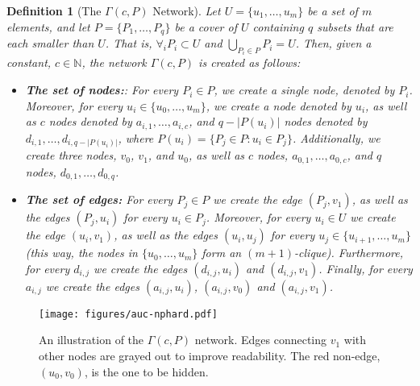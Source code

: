\documentclass[twocolumn]{article}
\newtheorem{definition}{Definition}
\newcommand{\N}{\mathbb{N}}
\begin{document}
\begin{definition}[The $\Gamma(c,P)$ Network]\label{def:GammNetwork} Let $U=\{u_1,\ldots, u_m\}$ be a set of $m$ elements, and let $P = \{P_1, \ldots, P_q\}$ be a cover of $U$ containing $q$ subsets that are each smaller than $U$. That is, $\forall_i P_i \subset U$ and $\bigcup_{P_i \in P}P_i=U$. Then, given a constant, $c \in \N$, the network $\Gamma(c,P)$ is created as follows:
%
\begin{itemize}[leftmargin=*]
\item \textbf{The set of nodes:}: For every $P_i \in P$, we create a single node, denoted by $P_i$. Moreover, for every $u_i \in \{u_0,\ldots, u_m\}$, we create a node denoted by $u_i$, as well as $c$ nodes denoted by $a_{i,1},\ldots,a_{i,c}$, and $q-|P(u_i)|$ nodes denoted by $d_{i,1},\ldots,d_{i,q-|P(u_i)|}$, where $P(u_i)=\{P_j \in P : u_i \in P_j\}$.
Additionally, we create three nodes, $v_0$, $v_1$, and $u_0$, as well as $c$ nodes, $a_{0,1},\ldots,a_{0,c}$, and $q$ nodes, $d_{0,1},\ldots,d_{0,q}$.
%
\item \textbf{The set of edges:} For every $P_j\in P$ we create the edge $(P_j,v_1)$, as well as the edges $(P_j,u_i)$ for every $u_i \in P_j$. Moreover, for every $u_i\in U$ we create the edge $(u_i,v_1)$, as well as the edges $(u_i,u_j)$ for every $u_j\in \{u_{i+1},\ldots, u_m\}$ (this way, the nodes in $\{u_0, \ldots, u_m\}$ form an $(m+1)$-clique). Furthermore, for every $d_{i,j}$ we create the edges $(d_{i,j},u_i)$ and $(d_{i,j},v_1)$. Finally, for every $a_{i,j}$ we create the edges $(a_{i,j},u_i)$, $(a_{i,j},v_0)$ and $(a_{i,j},v_1)$.
\end{itemize}
\end{definition}

\begin{figure}[thb]
\centering
\texttt{[image: figures/auc-nphard.pdf]}
\caption{An illustration of the $\Gamma(c,P)$ network. Edges connecting $v_1$ with other nodes are grayed out to improve readability. The red non-edge, $(u_0,v_0)$, is the one to be hidden.}
\label{fig:auc-nphard}
\end{figure}
\end{document}

